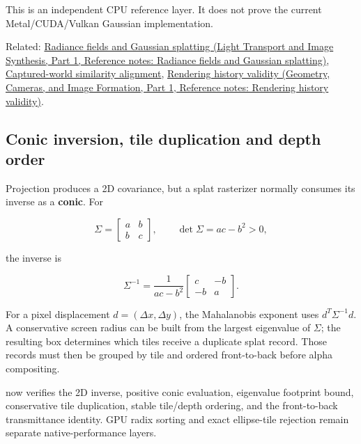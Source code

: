 This is an independent CPU reference layer. It does not prove the current Metal/CUDA/Vulkan Gaussian implementation.

Related: \href{../04-Light-Transport-and-Image-Synthesis-P01/main.pdf\#nameddest=appendix-c5b332e400e7}{Radiance fields and Gaussian splatting (Light Transport and Image Synthesis, Part 1, Reference notes: Radiance fields and Gaussian splatting)}, \hyperref[appendix-5f40b4fea463]{Captured-world similarity alignment}, \href{../03-Geometry-Cameras-and-Image-Formation-P01/main.pdf\#nameddest=appendix-2e7e9fd28a2c}{Rendering history validity (Geometry, Cameras, and Image Formation, Part 1, Reference notes: Rendering history validity)}.

\subsection{Conic inversion, tile duplication and depth order}\label{appendix-24269cb6977c-conic-inversion-tile-duplication-and-depth-order}

\hypertarget{appendix-24269cb6977c-conic-inversion-tile-duplication-and-depth-order}{}

Projection produces a 2D covariance, but a splat rasterizer normally consumes its inverse as a \textbf{conic}. For

\[
\Sigma=
\begin{bmatrix}
a&b\\
b&c
\end{bmatrix},
\qquad
\det\Sigma=ac-b^2>0,
\]

the inverse is

\[
\Sigma^{-1}
=
\frac{1}{ac-b^2}
\begin{bmatrix}
c&-b\\
-b&a
\end{bmatrix}.
\]

For a pixel displacement \(d=(\Delta x,\Delta y)\), the Mahalanobis exponent uses \(d^T\Sigma^{-1}d\). A conservative screen radius can be built from the largest eigenvalue of \(\Sigma\); the resulting box determines which tiles receive a duplicate splat record. Those records must then be grouped by tile and ordered front-to-back before alpha compositing.

 now verifies the 2D inverse, positive conic evaluation, eigenvalue footprint bound, conservative tile duplication, stable tile/depth ordering, and the front-to-back transmittance identity. GPU radix sorting and exact ellipse-tile rejection remain separate native-performance layers.
